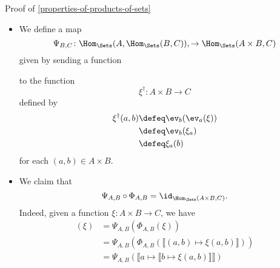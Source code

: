 \begin{Proof}{Proof of \cref{properties-of-products-of-sets}}
\begin{itemize}
            \[
                \xi^{\dagger}%
                \defeq%
                \llbracket a\mapsto\llbracket b\mapsto\xi(a,b)\rrbracket\rrbracket.%
            \]%
        \item{}We define a map
            \[
                \Psi_{B,C}%
                \colon%
                \Hom_{\Sets}(A,\Hom_{\Sets}(B,C)),%
                \to%
                \Hom_{\Sets}(A\times B,C)%
            \]%
            given by sending a function
            \begin{webcompile}
                \phantom{\xi\colon}
            \end{webcompile}
            to the function
            \[
                \xi^{\dagger}%
                \colon%
                A\times B%
                \to
                C
            \]%
            defined by
            \begin{align*}
                \xi^{\dagger}(a,b) &\defeq \ev_{b}(\ev_{a}(\xi))\\%
                                   &\defeq \ev_{b}(\xi_{a})\\%
                                   &\defeq \xi_{a}(b)%
            \end{align*}
            for each $(a,b)\in A\times B$.
        \item{}We claim that
            \[
                \Psi_{A,B}\circ\Phi_{A,B}%
                =%
                \id_{\Hom_{\Sets}(A\times B,C)}.%
            \]%
            Indeed, given a function $\xi\colon A\times B\to C$, we have
            \begin{align*}
                [\Psi_{A,B}\circ\Phi_{A,B}](\xi) &= \Psi_{A,B}(\Phi_{A,B}(\xi))\\%
                                                 &= \Psi_{A,B}(\Phi_{A,B}(\llbracket(a,b)\mapsto\xi(a,b)\rrbracket))\\%
                                                 &= \Psi_{A,B}(\llbracket a\mapsto\llbracket b\mapsto\xi(a,b)\rrbracket\rrbracket)\\%

\end{align*}
\end{itemize}
\end{Proof}
